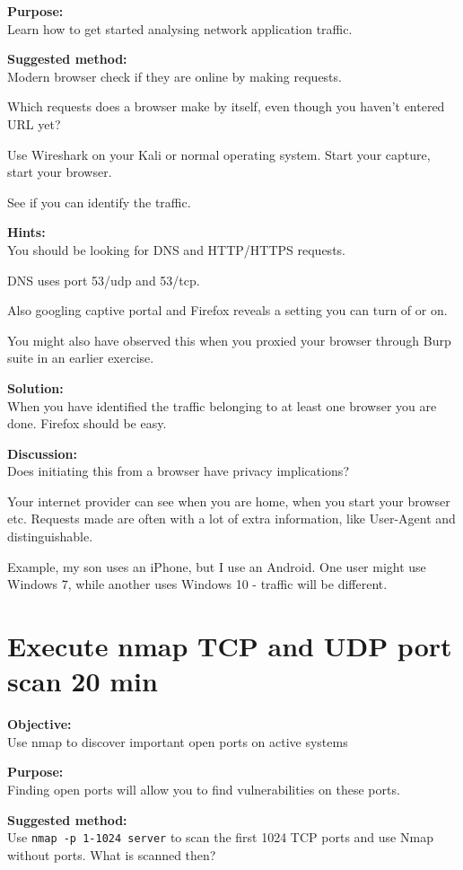 \documentclass[a4paper,11pt,notitlepage]{report}
\begin{document}
{\bf Purpose:}\\
Learn how to get started analysing network application traffic.

{\bf Suggested method:}\\
Modern browser check if they are online by making requests.

Which requests does a browser make by itself, even though you haven't entered URL yet?

Use Wireshark on your Kali or normal operating system. Start your capture, start your browser.

See if you can identify the traffic.

{\bf Hints:}\\
You should be looking for DNS and HTTP/HTTPS requests.

DNS uses port 53/udp and 53/tcp.

Also googling captive portal and Firefox reveals a setting you can turn of or on.

You might also have observed this when you proxied your browser through Burp suite in an earlier exercise.

{\bf Solution:}\\
When you have identified the traffic belonging to at least one browser you are done. Firefox should be easy.

{\bf Discussion:}\\
Does initiating this from a browser have privacy implications?

Your internet provider can see when you are home, when you start your browser etc. Requests made are often with a lot of extra information, like User-Agent and distinguishable.

Example, my son uses an iPhone, but I use an Android. One user might use Windows 7, while another uses Windows 10 - traffic will be different.



\chapter{Execute nmap TCP and UDP port scan 20 min}
\label{ex:nmap-synscan}


{\bf Objective:} \\
Use nmap to discover important open ports on active systems

{\bf Purpose:}\\
Finding open ports will allow you to find vulnerabilities on these ports.

{\bf Suggested method:}\\
Use \verb+nmap -p 1-1024 server+ to scan the first 1024 TCP
ports and use Nmap without ports. What is scanned then?
\end{document}
